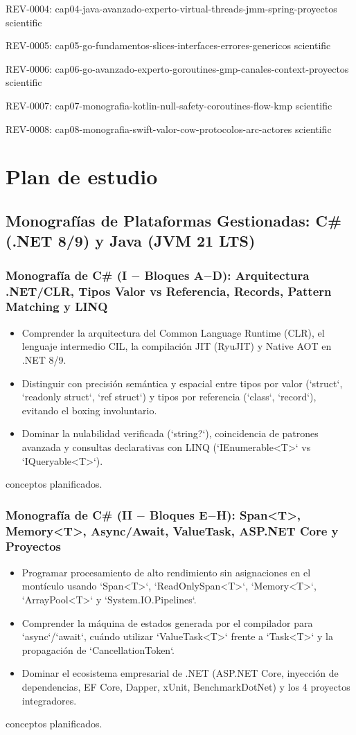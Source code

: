 \documentclass{book}
\begin{document}
\noindent REV-0004: cap04-java-avanzado-experto-virtual-threads-jmm-spring-proyectos scientific

\noindent REV-0005: cap05-go-fundamentos-slices-interfaces-errores-genericos scientific

\noindent REV-0006: cap06-go-avanzado-experto-goroutines-gmp-canales-context-proyectos scientific

\noindent REV-0007: cap07-monografia-kotlin-null-safety-coroutines-flow-kmp scientific

\noindent REV-0008: cap08-monografia-swift-valor-cow-protocolos-arc-actores scientific
\chapter{Plan de estudio}

\section*{Monografías de Plataformas Gestionadas: C\# (.NET 8/9) y Java (JVM 21 LTS)}

\subsection*{\checkmark Monografía de C\# (I \(-\) Bloques A\(-\)D): Arquitectura .NET/CLR, Tipos Valor vs Referencia, Records, Pattern Matching y LINQ}
\begin{itemize}
\item Comprender la arquitectura del Common Language Runtime (CLR), el lenguaje intermedio CIL, la compilación JIT (RyuJIT) y Native AOT en .NET 8/9.
\item Distinguir con precisión semántica y espacial entre tipos por valor (`struct`, `readonly struct`, `ref struct`) y tipos por referencia (`class`, `record`), evitando el boxing involuntario.
\item Dominar la nulabilidad verificada (`string?`), coincidencia de patrones avanzada y consultas declarativas con LINQ (`IEnumerable<T>` vs `IQueryable<T>`).
\end{itemize}
 conceptos planificados.

\subsection*{\checkmark Monografía de C\# (II \(-\) Bloques E\(-\)H): Span<T>, Memory<T>, Async/Await, ValueTask, ASP.NET Core y Proyectos}
\begin{itemize}
\item Programar procesamiento de alto rendimiento sin asignaciones en el montículo usando `Span<T>`, `ReadOnlySpan<T>`, `Memory<T>`, `ArrayPool<T>` y `System.IO.Pipelines`.
\item Comprender la máquina de estados generada por el compilador para `async`/`await`, cuándo utilizar `ValueTask<T>` frente a `Task<T>` y la propagación de `CancellationToken`.
\item Dominar el ecosistema empresarial de .NET (ASP.NET Core, inyección de dependencias, EF Core, Dapper, xUnit, BenchmarkDotNet) y los 4 proyectos integradores.
\end{itemize}
 conceptos planificados.
\end{document}
